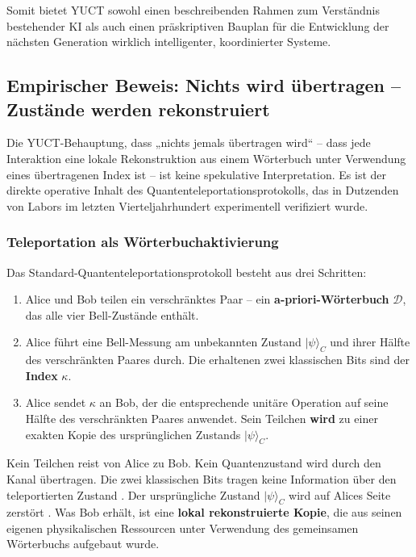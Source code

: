 \documentclass[12pt,a4paper]{article}
\theoremstyle{remark}
\begin{document}
	Somit bietet YUCT sowohl einen beschreibenden Rahmen zum Verständnis bestehender KI als auch einen präskriptiven Bauplan für die Entwicklung der nächsten Generation wirklich intelligenter, koordinierter Systeme.
	
	\subsection{Empirischer Beweis: Nichts wird übertragen – Zustände werden rekonstruiert}
	
	Die YUCT-Behauptung, dass „nichts jemals übertragen wird“ – dass jede Interaktion eine lokale Rekonstruktion aus einem Wörterbuch unter Verwendung eines übertragenen Index ist – ist keine spekulative Interpretation. Es ist der direkte operative Inhalt des Quantenteleportationsprotokolls, das in Dutzenden von Labors im letzten Vierteljahrhundert experimentell verifiziert wurde.
	
	\subsubsection{Teleportation als Wörterbuchaktivierung}
	
	Das Standard-Quantenteleportationsprotokoll \cite{Bennett1993} besteht aus drei Schritten:
	\begin{enumerate}
		\item Alice und Bob teilen ein verschränktes Paar – ein \textbf{a-priori-Wörterbuch} $\mathcal{D}$, das alle vier Bell-Zustände enthält.
		\item Alice führt eine Bell-Messung am unbekannten Zustand $|\psi\rangle_C$ und ihrer Hälfte des verschränkten Paares durch. Die erhaltenen zwei klassischen Bits sind der \textbf{Index} $\kappa$.
		\item Alice sendet $\kappa$ an Bob, der die entsprechende unitäre Operation auf seine Hälfte des verschränkten Paares anwendet. Sein Teilchen \textbf{wird} zu einer exakten Kopie des ursprünglichen Zustands $|\psi\rangle_C$.
	\end{enumerate}
	
	Kein Teilchen reist von Alice zu Bob. Kein Quantenzustand wird durch den Kanal übertragen. Die zwei klassischen Bits tragen keine Information über den teleportierten Zustand \cite{Pirandola2017}. Der ursprüngliche Zustand $|\psi\rangle_C$ wird auf Alices Seite zerstört \cite{Wootters1982}. Was Bob erhält, ist eine \textbf{lokal rekonstruierte Kopie}, die aus seinen eigenen physikalischen Ressourcen unter Verwendung des gemeinsamen Wörterbuchs aufgebaut wurde.
	
\end{document}
